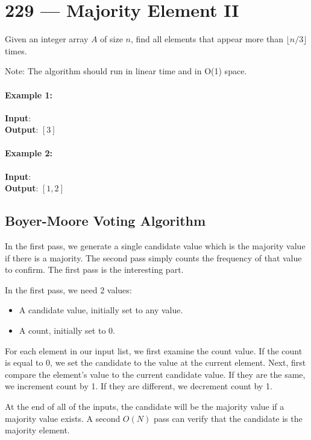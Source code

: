 \section{229 --- Majority Element II}
Given an integer array $A$ of size $n$, find all elements that appear more than $\lfloor n/3 \rfloor$ times.
\par
Note: The algorithm should run in linear time and in O(1) space.

\paragraph{Example 1:}

\begin{flushleft}
\textbf{Input}: \fcj{[3,2,3]}
\\
\textbf{Output}: $[3]$
\end{flushleft}

\paragraph{Example 2:}

\begin{flushleft}
\textbf{Input}: \fcj{[1,1,1,3,3,2,2,2]}
\\
\textbf{Output}: $[1,2]$
\end{flushleft}
\subsection{Boyer-Moore Voting Algorithm}
In the first pass, we generate a single candidate value which is the majority value if there is a majority. The second pass simply counts the frequency of that value to confirm. The first pass is the interesting part.

In the first pass, we need 2 values:
\begin{itemize}
\item A candidate value, initially set to any value.
\item A count, initially set to 0.
\end{itemize}

For each element in our input list, we first examine the count value. If the count is equal to 0, we set the candidate to the value at the current element. Next, first compare the element's value to the current candidate value. If they are the same, we increment count by 1. If they are different, we decrement count by 1.

At the end of all of the inputs, the candidate will be the majority value if a majority value exists. A second $ O(N) $ pass can verify that the candidate is the majority element.


